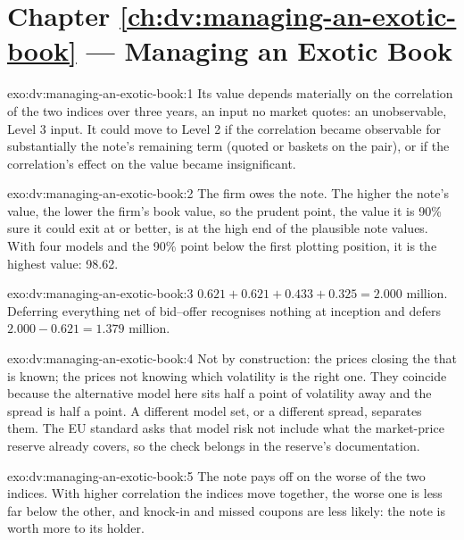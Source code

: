 \section*{Chapter \ref{ch:dv:managing-an-exotic-book} --- Managing an Exotic Book}

\begin{solution}{exo:dv:managing-an-exotic-book:1}
Its value depends materially on the correlation of the two indices over three years, an input no market quotes: an unobservable, Level 3 input. It could move to
Level 2 if the correlation became observable for substantially the note's remaining term (quoted  or baskets on the pair), or if the correlation's
effect on the value became insignificant.
\end{solution}

\begin{solution}{exo:dv:managing-an-exotic-book:2}
The firm owes the note. The higher the note's value, the lower the firm's book value, so the prudent point, the value it is 90\% sure it could exit at or better, is at
the high end of the plausible note values. With four models and the 90\% point below the first plotting position, it is the highest value: 98.62.
\end{solution}

\begin{solution}{exo:dv:managing-an-exotic-book:3}
$0.621+0.621+0.433+0.325=2.000$ million. Deferring everything net of bid--offer recognises nothing at inception and defers $2.000-0.621=1.379$ million.
\end{solution}

\begin{solution}{exo:dv:managing-an-exotic-book:4}
Not by construction: the  prices closing the  that is known; the  prices not knowing which volatility is the right one. They coincide
because the alternative model here sits half a point of volatility away and the spread is half a point. A different model set, or a different spread, separates them.
The EU standard asks that model risk not include what the market-price reserve already covers, so the check belongs in the reserve's documentation.
\end{solution}

\begin{solution}{exo:dv:managing-an-exotic-book:5}
The note pays off on the worse of the two indices. With higher correlation the indices move together, the worse one is less far below the other, and knock-in and missed
coupons are less likely: the note is worth more to its holder.
\end{solution}

